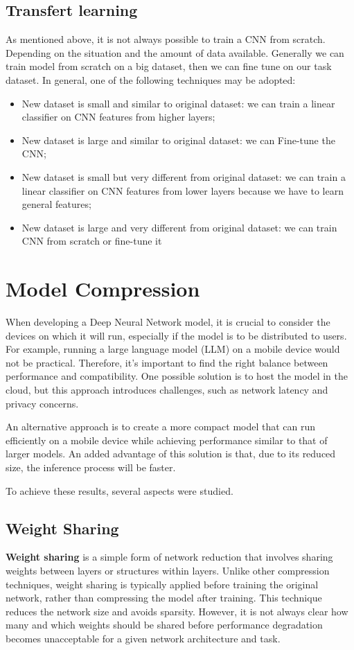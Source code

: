 \subsection{Transfert learning}
As mentioned above, it is not always possible to train a CNN from scratch. Depending on
the situation and the amount of data available. Generally we can train model from
scratch on a big dataset, then we can fine tune on our task dataset. In general,
one of the following techniques may be adopted:
\begin{itemize}
    \item New dataset is small and similar to original dataset: we can train a
          linear classifier on CNN features from higher layers;
    \item New dataset is large and similar to original dataset: we can Fine-tune
          the CNN;
    \item New dataset is small but very different from original dataset: we can
          train a linear classifier on CNN features from lower layers because we
          have to learn general features;
    \item New dataset is large and very different from original dataset: we can
          train CNN from scratch or fine-tune it
\end{itemize}

\section{Model Compression}
When developing a Deep Neural Network model, it is crucial to consider the devices
on which it will run, especially if the model is to be distributed to users. For
example, running a large language model (LLM) on a mobile device would not be
practical. Therefore, it's important to find the right balance between performance
and compatibility. One possible solution is to host the model in the cloud, but
this approach introduces challenges, such as network latency and privacy concerns.

An alternative approach is to create a more compact model that can run efficiently
on a mobile device while achieving performance similar to that of larger models.
An added advantage of this solution is that, due to its reduced size, the inference
process will be faster.

To achieve these results, several aspects were studied.
\subsection{Weight Sharing}
\textbf{Weight sharing} is a simple form of network reduction that involves
sharing weights between layers or structures within layers. Unlike other
compression techniques, weight sharing is typically applied before training the
original network, rather than compressing the model after training. This technique
reduces the network size and avoids sparsity. However, it is not always clear
how many and which weights should be shared before performance degradation becomes
unacceptable for a given network architecture and task.

